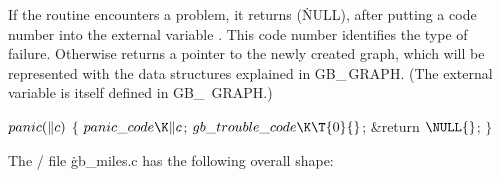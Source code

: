 If the  routine encounters a problem, it returns \PB{$%
\NULL$}
(\.{NULL}), after putting a code number into the external variable
. This code number identifies the type of failure.
Otherwise  returns a pointer to the newly created graph, which
will be represented with the data structures explained in {\sc GB\_\,GRAPH}.
(The external variable  is itself defined in {\sc GB\_%
\,GRAPH}.)

\Y\B\4\D$\\{panic}(\|c)$ \5
${}\{{}$\5
\1${}\\{panic\_code}\K\|c{}$;\5
${}\\{gb\_trouble\_code}\K\T{0}{}$;\5
\&{return} ${}\NULL{}$;\5
${}\}{}$\2\par
\fi

The \CEE/ file \.{gb\_miles.c} has the following overall shape:

